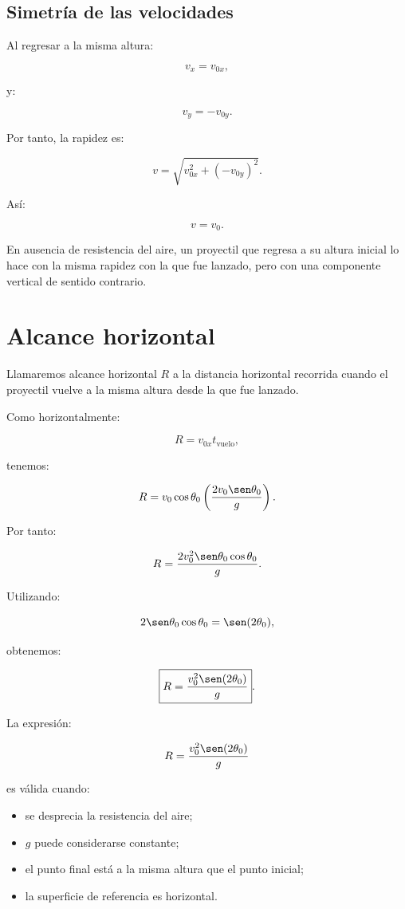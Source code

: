 \subsection{Simetría de las velocidades}

Al regresar a la misma altura:

\[
v_x=v_{0x},
\]

y:

\[
v_y=-v_{0y}.
\]

Por tanto, la rapidez es:

\[
v
=
\sqrt{
v_{0x}^2+(-v_{0y})^2
}.
\]

Así:

\[
\boxed{
v=v_0
}.
\]

\begin{interpretacion}
En ausencia de resistencia del aire, un proyectil que regresa a su altura inicial
lo hace con la misma rapidez con la que fue lanzado, pero con una componente
vertical de sentido contrario.
\end{interpretacion}


\section{Alcance horizontal}

Llamaremos alcance horizontal \(R\) a la distancia horizontal recorrida cuando el
proyectil vuelve a la misma altura desde la que fue lanzado.

Como horizontalmente:

\[
R=v_{0x}t_{\mathrm{vuelo}},
\]

tenemos:

\[
R
=
v_0\cos\theta_0
\left(
\frac{
2v_0\sen\theta_0
}{
g
}
\right).
\]

Por tanto:

\[
R
=
\frac{
2v_0^2\sen\theta_0\cos\theta_0
}{
g
}.
\]

Utilizando:

\[
2\sen\theta_0\cos\theta_0
=
\sen(2\theta_0),
\]

obtenemos:

\[
\boxed{
R
=
\frac{
v_0^2\sen(2\theta_0)
}{
g
}
}.
\]

\begin{condicion}
La expresión:

\[
R
=
\frac{
v_0^2\sen(2\theta_0)
}{
g
}
\]

es válida cuando:

\begin{itemize}
    \item se desprecia la resistencia del aire;
    \item \(g\) puede considerarse constante;
    \item el punto final está a la misma altura que el punto inicial;
    \item la superficie de referencia es horizontal.
\end{itemize}
\end{condicion}

